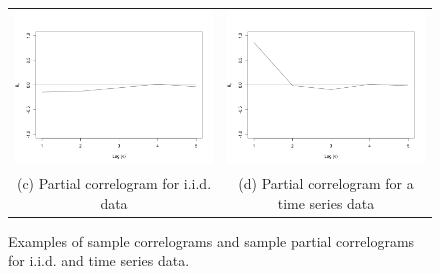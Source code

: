 \begin{itemize}
\begin{figure}[ht!]
\begin{center}
\begin{tabular}{cc}
\includegraphics[scale=0.25]{./figures/PreliminariesPartialCorrelogramGaussian} &
\includegraphics[scale=0.25]{./figures/PreliminariesPartialCorrelogramTimeSerie} \\
\small (c) Partial correlogram for i.i.d. data & (d) \small Partial correlogram for a time series data \\
\end{tabular}
\caption{\label{Figure:PreliminariesCorrelograms} Examples of sample correlograms and sample partial correlograms for i.i.d. and time series data. 
}
\end{center}
\end{figure}

\end{itemize}

